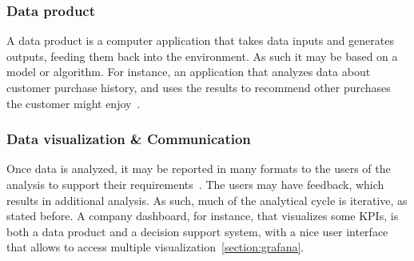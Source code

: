 \subsubsection{Data product}
A data product is a computer application that takes data inputs and generates outputs, feeding them back into the environment.
As such it may be based on a model or algorithm. For instance, an application that analyzes data about customer purchase history, and uses the results to recommend other purchases the customer might enjoy~\cite{Book:doing_data_science}.

\subsubsection{Data visualization \& Communication}
Once data is analyzed, it may be reported in many formats to the users of the analysis to support their requirements~\cite{Article:intro_to_data_analysis}.
The users may have feedback, which results in additional analysis. As such, much of the analytical cycle is iterative, as stated before.
A company dashboard, for instance, that visualizes some \ac{KPIs}, is both a data product and a decision support system, with a nice user interface that allows  to access multiple visualization~\ref{section:grafana}.

